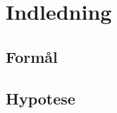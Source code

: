 \chapter{Indledning}\label{ch:Indledning}

\section{Formål}\label{sec:indledning-formål}
\lipsum[1-2]


\section{Hypotese}\label{sec:indledning-hypotese}
\lipsum[3-4]